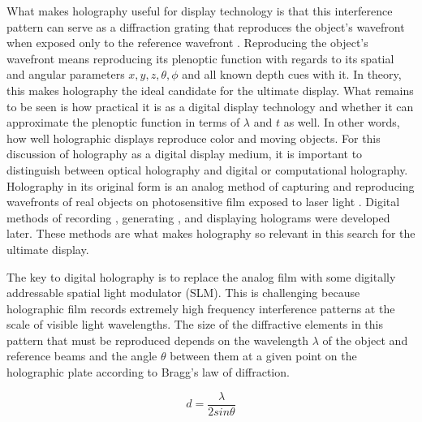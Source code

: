 What makes holography useful for display technology is that this interference pattern can serve as a diffraction grating that reproduces the object's wavefront when exposed only to the reference wavefront \cite{leith1961new, denisyuk1963reflection}. Reproducing the object's wavefront means reproducing its plenoptic function with regards to its spatial and angular parameters $x, y, z, \theta, \phi$ and all known depth cues with it. In theory, this makes holography the ideal candidate for the ultimate display. What remains to be seen is how practical it is as a digital display technology and whether it can approximate the plenoptic function in terms of $\lambda$ and $t$ as well. In other words, how well holographic displays reproduce color and moving objects. For this discussion of holography as a digital display medium, it is important to distinguish between optical holography and digital or computational holography. Holography in its original form is an analog method of capturing and reproducing wavefronts of real objects on photosensitive film exposed to laser light \cite{leith1961new, denisyuk1963reflection}. Digital methods of recording \cite{nesbitt1999holographic,schnars2002digital}, generating \cite{underkoffler1988development, underkoffler1991toward}, and displaying \cite{Kollin_Benton_Jepsen_1989} holograms were developed later. These methods are what makes holography so relevant in this search for the ultimate display.

The key to digital holography is to replace the analog film with some digitally addressable spatial light modulator (SLM). This is challenging because holographic film records extremely high frequency interference patterns at the scale of visible light wavelengths. The size of the diffractive elements in this pattern that must be reproduced depends on the wavelength $\lambda$ of the object and reference beams and the angle $\theta$ between them at a given point on the holographic plate according to Bragg's law of diffraction.

$$
d = \frac{\lambda}{2sin\theta}
$$



